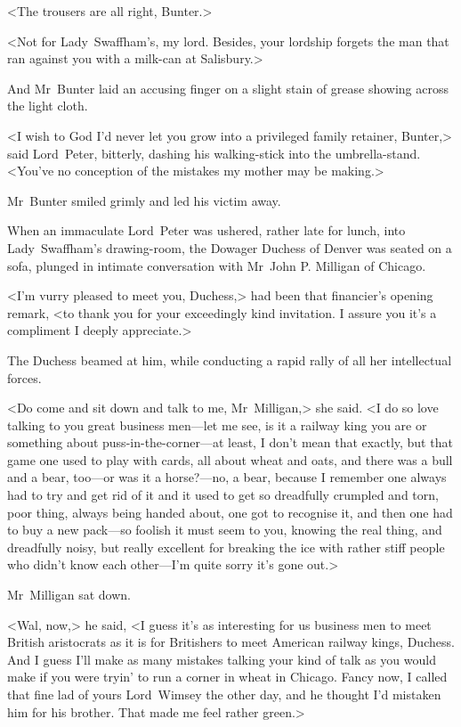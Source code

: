 <The trousers are all right, Bunter.>

<Not for Lady~Swaffham's, my lord. Besides, your lordship forgets the man that ran against you with a milk-can at Salisbury.>

And Mr~Bunter laid an accusing finger on a slight stain of grease showing across the light cloth.

<I wish to God I'd never let you grow into a privileged family retainer, Bunter,> said Lord~Peter, bitterly, dashing his walking-stick into the umbrella-stand. <You've no conception of the mistakes my mother may be making.>

Mr~Bunter smiled grimly and led his victim away.

When an immaculate Lord~Peter was ushered, rather late for lunch, into Lady~Swaffham's drawing-room, the Dowager Duchess of Denver was seated on a sofa, plunged in intimate conversation with Mr~John P\@. Milligan of Chicago.

<I'm vurry pleased to meet you, Duchess,> had been that financier's opening remark, <to thank you for your exceedingly kind invitation. I assure you it's a compliment I deeply appreciate.>

The Duchess beamed at him, while conducting a rapid rally of all her intellectual forces.

<Do come and sit down and talk to me, Mr~Milligan,> she said. <I do so love talking to you great business men—let me see, is it a railway king you are or something about puss-in-the-corner—at least, I don't mean that exactly, but that game one used to play with cards, all about wheat and oats, and there was a bull and a bear, too—or was it a horse?—no, a bear, because I remember one always had to try and get rid of it and it used to get so dreadfully crumpled and torn, poor thing, always being handed about, one got to recognise it, and then one had to buy a new pack—so foolish it must seem to you, knowing the real thing, and dreadfully noisy, but really excellent for breaking the ice with rather stiff people who didn't know each other—I'm quite sorry it's gone out.>

Mr~Milligan sat down.

<Wal, now,> he said, <I guess it's as interesting for us business men to meet British aristocrats as it is for Britishers to meet American railway kings, Duchess. And I guess I'll make as many mistakes talking your kind of talk as you would make if you were tryin' to run a corner in wheat in Chicago. Fancy now, I called that fine lad of yours Lord~Wimsey the other day, and he thought I'd mistaken him for his brother. That made me feel rather green.>

